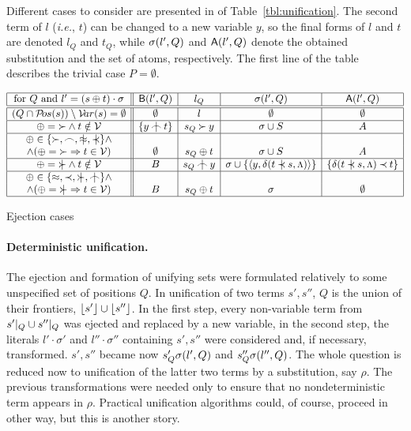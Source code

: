 Different cases to consider are presented in 
of Table~\ref {tbl:unification}.  The second term of $l$ ({\it i.e.}, $t$)
can be changed to a new variable $y$, so the final forms of $l$ and $t$ are
denoted $l_Q$ and $t_Q$, while \(\sigma(l',Q)\) and \({\sf A}(l',Q)\) denote the
obtained substitution and the set of atoms, respectively.  The first line of
the table describes the trivial case \(P=\emptyset\).

\begin{table}[hbt]
\begin{center}
\(
\begin{array}{|c||c|c|c|c|}
\hline
   \mbox{for }Q\mbox{ and }l'=(s\oplus t)\cdot \sigma & \Bin(l',Q) & l_Q & \Sub(l',Q) & \At(l',Q) \\
\hline\hline
 (Q\cap\Pos s)\setminus \Var s=\es & \es & l & \es & \es \\ 
\hline
 \oplus=\Cont\land t\notin \Vars & \{y\notInt t\} & s_Q\Cont y & \sigma\cup S & A \\
\hline
 \oplus\in\{\Cont,\Int,\notEq,\notIncl\}\land & & & & \\
 \land (\oplus=\Cont\then t\in \Vars) & \es & s_Q\oplus t & \sigma\cup S & A \\
\hline
 \oplus=\notCont\land t\notin \Vars & B & s_Q\notInt y & \sigma\cup\{\<y,\dt {t\notIncl s}{\Top}\>\} & \{\dt {t\notIncl s}{\Top}\Incl t\} \\
\hline
  \oplus\in\{\Eq,\Incl,\notCont,\notInt\}\land & & & & \\
  \land( \oplus=\notCont\then t\in \Vars) & B & s_Q\oplus t & \sigma & \es \\
\hline
\end{array}
\)
\end{center}
\caption{Ejection cases} \vspace{-3ex} \label{tbl:unification}
\end{table}
%
\paragraph{Deterministic unification.\ }
%
The ejection and formation of unifying sets were formulated relatively to
some unspecified set of positions $Q$.  In unification of two terms $s',s''$,
$Q$ is the union of their frontiers, \(\lfloor s'\rfloor\cup \lfloor s''\rfloor\).  In the first step, every non-variable term from \(s'|_{Q}\cup s''|_{Q}\) was ejected and replaced by a new variable, in the
second step, the literals $l'\cdot\sigma'$ and $l''\cdot\sigma''$ containing
$s',s''$ were considered and, if necessary, transformed.  $s',s''$ became now
\(s'_Q\sigma(l',Q)\) and \(s''_Q\sigma(l'',Q)\).  The whole question is reduced
now to unification of the latter two terms by a substitution, say $\rho$.
The previous transformations were needed only to ensure that no 
nondeterministic term appears in $\rho$.  Practical unification algorithms 
could, of course, proceed in other way, but this is another story.

